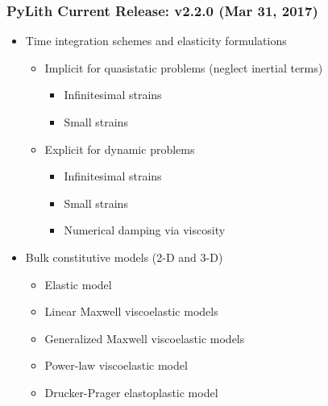 \documentclass[aspectratio=169,hyperref=colorlinks]{beamer}
\begin{document}
\begin{frame}
  \frametitle{PyLith Current Release: v2.2.0 (Mar 31, 2017)}
  \summary{}

  \begin{itemize}
  \item Time integration schemes and elasticity formulations
    \begin{itemize}
    \item Implicit for quasistatic problems (neglect inertial terms)
      \begin{itemize}
      \item Infinitesimal strains
      \item Small strains
      \end{itemize}
    \item Explicit for dynamic problems
      \begin{itemize}
      \item Infinitesimal strains
      \item Small strains
      \item Numerical damping via viscosity
     \end{itemize}
    \end{itemize}
  \item Bulk constitutive models (2-D and 3-D)
    \begin{itemize}
    \item Elastic model 
    \item Linear Maxwell viscoelastic models
    \item Generalized Maxwell viscoelastic models
    \item Power-law viscoelastic model
    \item Drucker-Prager elastoplastic model
    \end{itemize}
 \end{itemize}

\end{frame}
\end{document}
